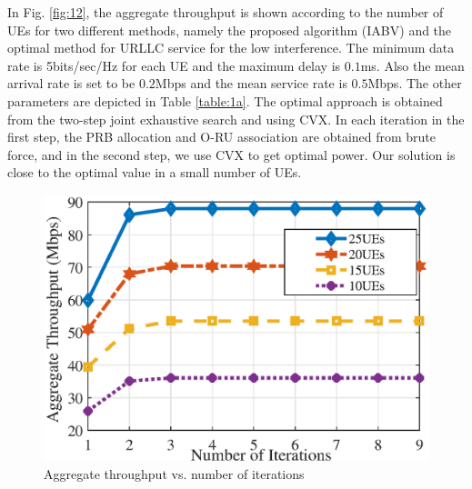 \documentclass[lettersize,journal]{IEEEtran}
\begin{document}
In Fig. \ref{fig:12}, the aggregate throughput is shown according to the number of UEs for two different methods, namely the
proposed algorithm (IABV) and the optimal method for URLLC service for the low interference.
The minimum data rate is 5bits/sec/Hz for each UE and the maximum delay is $0.1$ms.
Also the mean arrival rate is set to be $0.2$Mbps and the mean service rate is $0.5$Mbps.
The other parameters are depicted in Table \ref{table:1a}.
The optimal approach is obtained from the two-step joint exhaustive search and using CVX.
In each iteration in the first step, the PRB allocation and O-RU association are obtained from brute force, and in the second step, we use CVX to get optimal power.
Our solution is close to the optimal value in a small number of UEs.
\begin{figure}%
  \centering
     \includegraphics[scale = 0.5]{fig/itern.eps}
  \caption{Aggregate throughput vs. number of iterations}
  \label{fig:11}
\end{figure}
\end{document}
